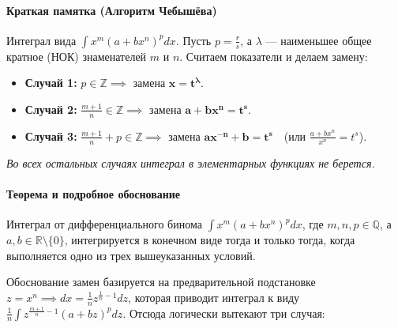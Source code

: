 \paragraph{Краткая памятка (Алгоритм Чебышёва)}
Интеграл вида $\int x^m (a+bx^n)^p dx$. Пусть $p = \frac{r}{s}$, а $\lambda$ — наименьшее общее кратное (НОК) знаменателей $m$ и $n$. Считаем показатели и делаем замену:
\begin{itemize}
    \item \textbf{Случай 1:} $p \in \mathbb{Z} \implies$ замена $\boldsymbol{x = t^\lambda}$.
    \item \textbf{Случай 2:} $\frac{m+1}{n} \in \mathbb{Z} \implies$ замена $\boldsymbol{a+bx^n = t^s}$.
    \item \textbf{Случай 3:} $\frac{m+1}{n} + p \in \mathbb{Z} \implies$ замена $\boldsymbol{ax^{-n}+b = t^s}$ \,\, (или $\frac{a+bx^n}{x^n} = t^s$).
\end{itemize}
\textit{Во всех остальных случаях интеграл в элементарных функциях не берется.}

\paragraph{Теорема и подробное обоснование}
\begin{theorem}[Чебышёва]
Интеграл от дифференциального бинома $\int x^{m}(a+bx^{n})^{p}dx$, где $m, n, p \in \mathbb{Q}$, а $a, b \in \mathbb{R} \setminus \{0\}$, интегрируется в конечном виде тогда и только тогда, когда выполняется одно из трех вышеуказанных условий.
\end{theorem}

Обоснование замен базируется на предварительной подстановке $z = x^n \implies dx = \frac{1}{n}z^{\frac{1}{n}-1}dz$, которая приводит интеграл к виду $\frac{1}{n}\int z^{\frac{m+1}{n}-1}(a+bz)^p dz$. Отсюда логически вытекают три случая:

